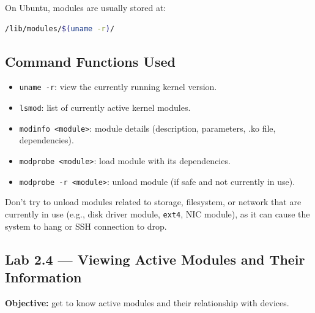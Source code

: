 On Ubuntu, modules are usually stored at:
\begin{lstlisting}[language=bash, caption={Kernel module location}]
/lib/modules/$(uname -r)/
\end{lstlisting}

\subsection*{Command Functions Used}
\begin{itemize}
    \item \texttt{uname -r}: view the currently running kernel version.
    \item \texttt{lsmod}: list of currently active kernel modules.
    \item \texttt{modinfo <module>}: module details (description, parameters, .ko file, dependencies).
    \item \texttt{modprobe <module>}: load module with its dependencies.
    \item \texttt{modprobe -r <module>}: unload module (if safe and not currently in use).
\end{itemize}

\begin{warningbox}
Don't try to unload modules related to storage, filesystem, or network that are currently in use (e.g., disk driver module, \texttt{ext4}, NIC module),
as it can cause the system to hang or SSH connection to drop.
\end{warningbox}

\subsection*{Lab 2.4 --- Viewing Active Modules and Their Information}
\textbf{Objective:} get to know active modules and their relationship with devices.


